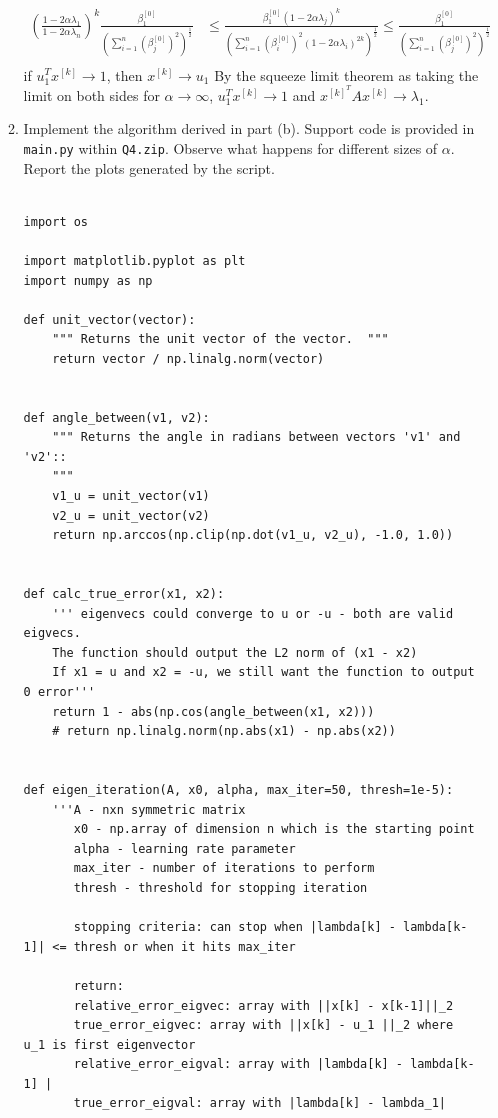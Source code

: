 \documentclass[12pt,twoside]{article}
\begin{document}
\begin{enumerate}
\begin{enumerate}
\begin{align*}
	(\frac{1-2 \alpha \lambda_1}{1-2 \alpha \lambda_n})^k \frac{\beta_1^{[0]}} {(\sum_{i=1}^n (\beta_j^{[0]})^2)^{\frac{1}{2}}} 
		&\le \frac{ \beta_1^{[0]} (1 - 2 \alpha \lambda_j)^k }  { (\sum_{i=1}^n (\beta_i^{[0]})^2 (1 - 2 \alpha \lambda_i)^{2k} )^{\frac{1}{2}} } 
		\le \frac{\beta_1^{[0]}} {(\sum_{i=1}^n (\beta_j^{[0]})^2)^{\frac{1}{2}}} \\
\end{align*}
if $u_1^T x^{[k]} \to 1$, then $x^{[k]} \to u_1$
By the squeeze limit theorem as taking the limit on both sides for $\alpha \to \infty$, $u_1^T x^{[k]}  \to 1$ and $x^{[k]^T} A x^{[k]} \to \lambda_1$.

\item Implement the algorithm derived in part (b). Support code is provided in {\tt main.py} within {\tt Q4.zip}. Observe what happens for different sizes of $\alpha$. Report the plots generated by the script.

\begin{verbatim}

import os

import matplotlib.pyplot as plt
import numpy as np

def unit_vector(vector):
    """ Returns the unit vector of the vector.  """
    return vector / np.linalg.norm(vector)


def angle_between(v1, v2):
    """ Returns the angle in radians between vectors 'v1' and 'v2'::
    """
    v1_u = unit_vector(v1)
    v2_u = unit_vector(v2)
    return np.arccos(np.clip(np.dot(v1_u, v2_u), -1.0, 1.0))


def calc_true_error(x1, x2):
    ''' eigenvecs could converge to u or -u - both are valid eigvecs.
    The function should output the L2 norm of (x1 - x2)
    If x1 = u and x2 = -u, we still want the function to output 0 error'''
    return 1 - abs(np.cos(angle_between(x1, x2)))
    # return np.linalg.norm(np.abs(x1) - np.abs(x2))


def eigen_iteration(A, x0, alpha, max_iter=50, thresh=1e-5):
    '''A - nxn symmetric matrix
       x0 - np.array of dimension n which is the starting point
       alpha - learning rate parameter
       max_iter - number of iterations to perform
       thresh - threshold for stopping iteration

       stopping criteria: can stop when |lambda[k] - lambda[k-1]| <= thresh or when it hits max_iter

       return:
       relative_error_eigvec: array with ||x[k] - x[k-1]||_2
       true_error_eigvec: array with ||x[k] - u_1 ||_2 where u_1 is first eigenvector
       relative_error_eigval: array with |lambda[k] - lambda[k-1] |
       true_error_eigval: array with |lambda[k] - lambda_1|


\end{verbatim}
\end{enumerate}
\end{enumerate}
\end{document}
